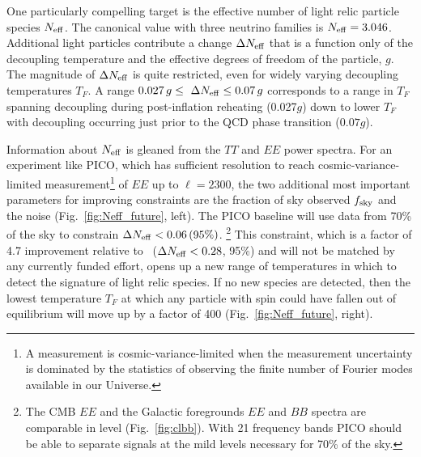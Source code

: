 \documentclass[PICOReport.tex]{subfiles}
\begin{document}
One particularly compelling target is the effective number of light relic particle species ${N_{\rm eff}}$. The canonical value with three neutrino families is ${N_{\rm eff}} = 3.046$. Additional light particles contribute a change $\Delta {N_{\rm eff}}$ that is a function only of the decoupling temperature and the effective degrees of freedom of the particle, $g$. The magnitude of $\Delta{N_{\rm eff}}$ is quite restricted, even for widely varying decoupling temperatures $T_{F}$. A range $ 0.027\,g \leq \ \Delta {N_{\rm eff}} \leq 0.07\,g$ corresponds to a range in $T_{F}$ spanning decoupling during post-inflation reheating (0.027$g$) down to lower $T_{F}$ with decoupling occurring just prior to the QCD phase transition ($0.07g$).

Information about ${N_{\rm eff}}$ is gleaned from the $TT$ and $EE$ power spectra. For an experiment like PICO, which has sufficient resolution to reach cosmic-variance-limited measurement\footnote{A measurement is cosmic-variance-limited when the measurement uncertainty is dominated by the statistics of observing the finite number of Fourier modes available in our Universe.} of $EE$ up to $\ell =2300$, the two additional most important parameters for improving constraints are the fraction of sky observed $f_{\rm sky}$ and the noise (Fig.~\ref{fig:Neff_future}, left). The PICO baseline will use data from 70\% of the sky to constrain $\Delta {N_{\rm eff}} < 0.06 \, (95\%)$. \footnote{The CMB $EE$ and the Galactic foregrounds $EE$ and $BB$ spectra are comparable in level (Fig.~\ref{fig:clbb}). With 21 frequency bands PICO should be able to separate signals at the mild levels necessary for 70\% of the sky.} This constraint, which is a factor of 4.7 improvement relative to \planck~($\Delta {N_{\rm eff}} < 0.28$, 95\%) and will not be matched by any currently funded effort, opens up a new range of temperatures in which to detect the signature of light relic species. If no new species are detected, then the lowest temperature $T_{F}$ at which any particle with spin could have fallen out of equilibrium will move up by a factor of 400 (Fig.~\ref{fig:Neff_future}, right). 
\end{document}
